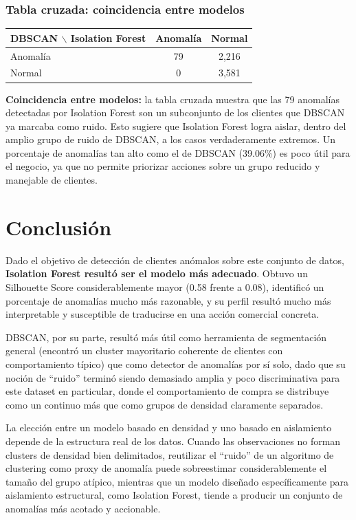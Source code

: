 \documentclass[11pt]{article}
\begin{document}
\subsubsection*{Tabla cruzada: coincidencia entre modelos}

\begin{table}[H]
\centering
\begin{tabular}{lcc}
\toprule
\textbf{DBSCAN $\backslash$ Isolation Forest} & \textbf{Anomalía} & \textbf{Normal} \\
\midrule
Anomalía & 79 & 2,216 \\
Normal & 0 & 3,581 \\
\bottomrule
\end{tabular}
\end{table}

\textbf{Coincidencia entre modelos:} la tabla cruzada muestra que las 79 anomalías detectadas por Isolation Forest
son un subconjunto de los clientes que DBSCAN ya marcaba como ruido. Esto sugiere que Isolation Forest
logra aislar, dentro del amplio grupo de ruido de DBSCAN, a los casos verdaderamente extremos. Un
porcentaje de anomalías tan alto como el de DBSCAN (39.06\%) es poco útil para el negocio, ya que no
permite priorizar acciones sobre un grupo reducido y manejable de clientes.

\section*{Conclusión}

Dado el objetivo de detección de clientes anómalos sobre este conjunto de datos, \textbf{Isolation Forest resultó
ser el modelo más adecuado}. Obtuvo un Silhouette Score considerablemente mayor (0.58 frente a 0.08),
identificó un porcentaje de anomalías mucho más razonable, y su perfil resultó mucho más interpretable
y susceptible de traducirse en una acción comercial concreta.

DBSCAN, por su parte, resultó más útil como herramienta de segmentación general (encontró un cluster
mayoritario coherente de clientes con comportamiento típico) que como detector de anomalías por sí
solo, dado que su noción de ``ruido'' terminó siendo demasiado amplia y poco discriminativa para este
dataset en particular, donde el comportamiento de compra se distribuye como un continuo más que como
grupos de densidad claramente separados.

La elección entre un modelo basado en densidad y uno basado en aislamiento depende de la estructura
real de los datos. Cuando las observaciones no forman clusters de densidad bien delimitados, reutilizar el
``ruido'' de un algoritmo de clustering como proxy de anomalía puede sobreestimar considerablemente el
tamaño del grupo atípico, mientras que un modelo diseñado específicamente para aislamiento
estructural, como Isolation Forest, tiende a producir un conjunto de anomalías más acotado y accionable.
\end{document}
